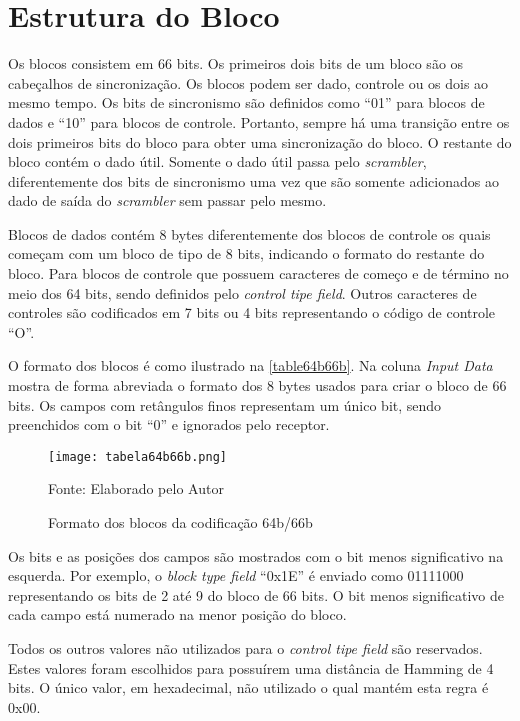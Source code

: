 \section{Estrutura do Bloco}

Os blocos consistem em 66 bits. Os primeiros dois bits de um bloco são os cabeçalhos de sincronização. Os blocos podem ser dado, controle ou os dois ao mesmo tempo. Os bits de sincronismo são definidos como “01” para blocos de dados e “10” para blocos de controle. Portanto, sempre há uma transição entre os dois primeiros bits do bloco para obter uma sincronização do bloco. O restante do bloco contém o dado útil. Somente o dado útil passa pelo \textit{scrambler}, diferentemente dos bits de sincronismo uma vez que são somente adicionados ao dado de saída do \textit{scrambler} sem passar pelo mesmo.

Blocos de dados contém 8 bytes diferentemente dos blocos de controle os quais começam com um bloco de tipo de 8 bits, indicando o formato do restante do bloco. Para blocos de controle que possuem caracteres de começo e de término no meio dos 64 bits, sendo definidos pelo \textit{control tipe field}. Outros caracteres de controles são codificados em 7 bits ou 4 bits representando o código de controle “O”.

O formato dos blocos é como ilustrado na \autoref{table64b66b}. Na coluna \textit{Input Data} mostra de forma abreviada o formato dos 8 bytes usados para criar o bloco de 66 bits. Os campos com retângulos finos representam um único bit, sendo preenchidos com o bit “0” e ignorados pelo receptor.

\begin{figure}[H]
	\caption{\label{table64b66b}Formato dos blocos da codificação 64b/66b}
	\centering
	\texttt{[image: tabela64b66b.png]}
	\begin{center}
		Fonte: Elaborado pelo Autor
	\end{center}	
\end{figure}

Os bits e as posições dos campos são mostrados com o bit menos significativo na esquerda. Por exemplo, o \textit{block type field} “0x1E” é enviado como 01111000 representando os bits de 2 até 9 do bloco de 66 bits. O bit menos significativo de cada campo está numerado na menor posição do bloco. 

Todos os outros valores não utilizados para o \textit{control tipe field} são reservados. Estes valores foram escolhidos para possuírem uma distância de Hamming de 4 bits. O único valor, em hexadecimal, não utilizado o qual mantém esta regra é 0x00.

